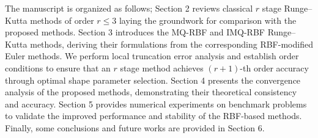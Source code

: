 \documentclass[a4paper, preprint,11pt]{elsarticle}
\numberwithin{equation}{section}
\begin{document}
The manuscript is organized as follows; Section 2 reviews classical 
$r$ stage Runge–Kutta methods of order $r\leq 3$ laying the groundwork for comparison with the proposed methods. Section 3 introduces the MQ-RBF and IMQ-RBF Runge–Kutta methods, deriving their formulations from the corresponding RBF-modified Euler methods. We perform local truncation error analysis and establish order conditions to ensure that an  $r$ stage method achieves $(r+1)$-th order accuracy through optimal shape parameter selection. Section 4 presents the convergence analysis of the proposed methods, demonstrating their theoretical consistency and accuracy. Section 5 provides numerical experiments on benchmark problems to validate the improved performance and stability of the RBF-based methods. Finally, some conclusions and future works are provided in Section 6.
\end{document}
